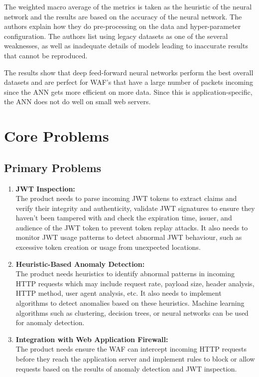 \documentclass[a4paper, onecolumn, 12pt]{IEEEtran}
\begin{document}
The weighted macro average of the metrics is taken as the heuristic of the neural network and the results are based on the accuracy of the neural network. The authors explain how they do pre-processing on the data and hyper-parameter configuration. The authors list using legacy datasets as one of the several weaknesses, as well as inadequate details of models leading to inaccurate results that cannot be reproduced.

The results show that deep feed-forward neural networks perform the best overall datasets and are perfect for WAF's that have a large number of packets incoming since the ANN gets more efficient on more data. Since this is application-specific, the ANN does not do well on small web servers.

\section{Core Problems}
\subsection{Primary Problems}
\begin{enumerate}
    \item \textbf{JWT Inspection:}\\
        The product needs to parse incoming JWT tokens to extract claims and verify their integrity and authenticity, validate JWT signatures to ensure they haven't been tampered with and check the expiration time, issuer, and audience of the JWT token to prevent token replay attacks. It also needs to monitor JWT usage patterns to detect abnormal JWT behaviour, such as excessive token creation or usage from unexpected locations.
    
    \item \textbf{Heuristic-Based Anomaly Detection:}\\
        The product needs heuristics to identify abnormal patterns in incoming HTTP requests which may include request rate, payload size, header analysis, HTTP method, user agent analysis, etc. It also needs to implement algorithms to detect anomalies based on these heuristics. Machine learning algorithms such as clustering, decision trees, or neural networks can be used for anomaly detection.

    \item \textbf{Integration with Web Application Firewall:}\\
        The product needs ensure the WAF can intercept incoming HTTP requests before they reach the application server and implement rules to block or allow requests based on the results of anomaly detection and JWT inspection.
\end{enumerate}
\end{document}
